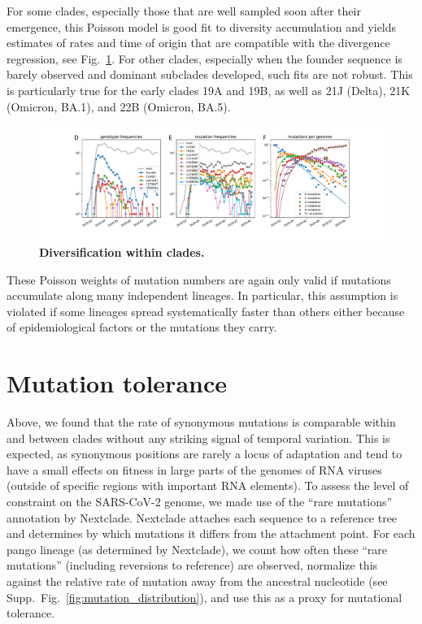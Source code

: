 \documentclass[aps,rmp, twocolumn]{revtex4}
\begin{document}
For some clades, especially those that are well sampled soon after their emergence, this Poisson model is good fit to diversity accumulation and yields estimates of rates and time of origin that are compatible with the divergence regression, see Fig.~\ref{fig:within_clades}.
For other clades, especially when the founder sequence is barely observed and dominant subclades developed, such fits are not robust.
This is particularly true for the early clades 19A and 19B, as well as 21J (Delta), 21K (Omicron, BA.1), and 22B (Omicron, BA.5).

\begin{figure}
    \includegraphics[width=\textwidth]{figures/counts/20C_counts.pdf}
    \caption{{\bf Diversification within clades.} \label{fig:within_clades}}
\end{figure}

These Poisson weights of mutation numbers are again only valid if mutations accumulate along many independent lineages.
In particular, this assumption is violated if some lineages spread systematically faster than others either because of epidemiological factors or the mutations they carry.


\section*{Mutation tolerance}

Above, we found that the rate of synonymous mutations is comparable within and between clades without any striking signal of temporal variation.
This is expected, as synonymous positions are rarely a locus of adaptation and tend to have a small effects on fitness in large parts of the genomes of RNA viruses \citep{zanini_vivo_2017} (outside of specific regions with important RNA elements).
To assess the level of constraint on the SARS-CoV-2 genome, we made use of the ``rare mutations'' annotation by Nextclade.
Nextclade attaches each sequence to a reference tree and determines by which mutations it differs from the attachment point.
For each pango lineage (as determined by Nextclade), we count how often these ``rare mutations'' (including reversions to reference) are observed, normalize this against the relative rate of mutation away from the ancestral nucleotide (see Supp.~Fig.~\ref{fig:mutation_distribution}), and use this as a proxy for mutational tolerance.
\end{document}
